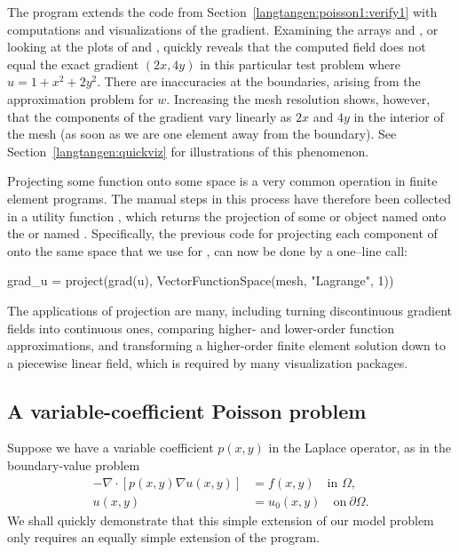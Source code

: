 The program  extends the code 
from Section~\ref{langtangen:poisson1:verify1} with computations
and visualizations of the gradient.  Examining the arrays
 and , or looking at the
plots of  and , quickly reveals that the
computed  field does not equal the exact gradient $(2x,
4y)$ in this particular test problem where $u=1+x^2+2y^2$.  There are
inaccuracies at the boundaries, arising from the approximation problem for
$w$. Increasing the mesh resolution shows, however, that the components
of the gradient vary linearly as $2x$ and $4y$ in the interior of
the mesh (as soon as we are one element away from the boundary). See
Section~\ref{langtangen:quickviz} for illustrations of this phenomenon.

Projecting some function onto some space is a very common
operation in finite element programs. The manual steps in this process
have therefore been collected in a utility function ,
which returns the projection of some  or  object
named  onto the  or 
named .
Specifically, the previous code for
projecting each component of  onto
the same space that we use for , can now be done by
a one--line call:
\begin{python}
grad_u = project(grad(u), VectorFunctionSpace(mesh, "Lagrange", 1))
\end{python}
The applications of projection are many, including turning discontinuous
gradient fields into continuous ones, comparing higher- and lower-order
function approximations, and transforming a higher-order finite element
solution down to a piecewise linear field, which is required by many
visualization packages.

\subsection{A variable-coefficient Poisson problem}
\label{langtangen:possion:2D:varcoeff}

Suppose we have a variable coefficient $p(x,y)$ in the Laplace operator,
as in the boundary-value problem
\begin{equation} \label{langtangen:poisson:2D:varcoeff}
  \begin{split}
    - \nabla\cdot \left\lbrack
p(x,y)\nabla u(x,y)\right\rbrack &= f(x,y) \quad \mbox{in } \Omega,
    \\
    u(x,y) &= u_0(x,y) \quad \mbox{on}\  \partial\Omega.
  \end{split}
\end{equation}
We shall quickly demonstrate that this simple extension of our model
problem only requires an equally simple extension of the \fenics{} program.

